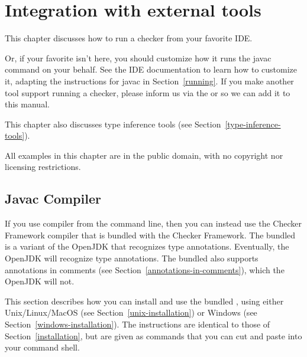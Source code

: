 \htmlhr
\chapter{Integration with external tools\label{external-tools}}

This chapter discusses how to run a checker from your favorite IDE\@.

Or, if your favorite isn't here, you should customize how it runs the
javac command on your behalf.  See the IDE documentation to learn how to
customize it, adapting the instructions for javac in Section~\ref{running}.
If you make another tool support running a checker, please
inform us via the
 or
 so
we can add it to this manual.

This chapter also discusses type inference tools (see
Section~\ref{type-inference-tools}).

All examples in this chapter are in the public domain, with no copyright nor
licensing restrictions.


\section{Javac Compiler\label{javac-installation}}

If you use  compiler from the command line, then you can
instead use the Checker Framework compiler that is bundled with the Checker
Framework.  The bundled  is a variant of the OpenJDK
 that recognizes type annotations.  Eventually, the OpenJDK
 will recognize type annotations.  The bundled 
also supports annotations in comments (see
Section~\ref{annotations-in-comments}), which the OpenJDK  will
not.

This section describes how you can install and use the bundled
, using either Unix/Linux/MacOS (see
Section~\ref{unix-installation}) or Windows (see
Section~\ref{windows-installation}).
The instructions are identical to those of Section~\ref{installation},
but are given as commands that you can cut and paste into your command shell.



